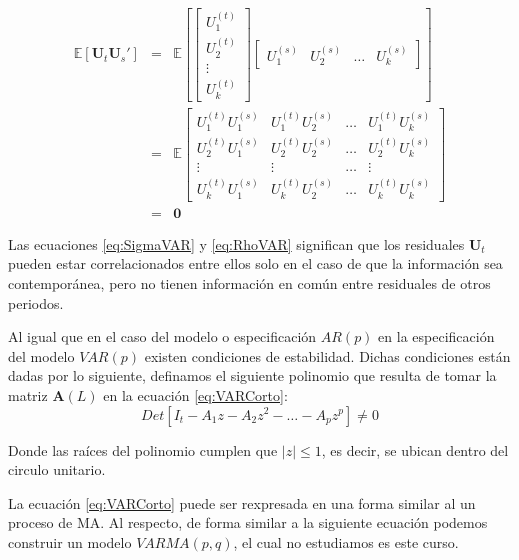 \documentclass[
]{book}
\begin{document}
\begin{enumerate}
\begin{eqnarray}
      \mathbb{E} [\mathbf{U}_t \mathbf{U}_s'] 
      & = &
      \mathbb{E} \left[
      \begin{bmatrix}
      U^{(t)}_{1} \\ U^{(t)}_{2} \\ \vdots \\ U^{(t)}_{k}
      \end{bmatrix}
      \begin{bmatrix}
      U^{(s)}_{1} & U^{(s)}_{2} & \ldots & U^{(s)}_{k}
      \end{bmatrix}
      \right] \nonumber \\
      & =  & \mathbb{E}
      \begin{bmatrix}
      U^{(t)}_{1} U^{(s)}_{1} & U^{(t)}_{1} U^{(s)}_{2} & \ldots & U^{(t)}_{1} U^{(s)}_{k} \\
      U^{(t)}_{2} U^{(s)}_{1} & U^{(t)}_{2} U^{(s)}_{2} & \ldots & U^{(t)}_{2} U^{(s)}_{k} \\
      \vdots & \vdots & \ldots & \vdots \\
      U^{(t)}_{k} U^{(s)}_{1} & U^{(t)}_{k} U^{(s)}_{2} & \ldots & U^{(t)}_{k} U^{(s)}_{k}
      \end{bmatrix} \nonumber \\
      & = & \mathbf{0}
      \label{eq:RhoVAR}
  \end{eqnarray}
\end{enumerate}

Las ecuaciones \eqref{eq:SigmaVAR} y \eqref{eq:RhoVAR} significan que los
residuales \(\mathbf{U}_t\) pueden estar correlacionados entre ellos solo
en el caso de que la información sea contemporánea, pero no tienen
información en común entre residuales de otros periodos.

Al igual que en el caso del modelo o especificación \(AR(p)\) en la
especificación del modelo \(VAR(p)\) existen condiciones de estabilidad.
Dichas condiciones están dadas por lo siguiente, definamos el siguiente
polinomio que resulta de tomar la matriz \(\mathbf{A}(L)\) en la ecuación
\eqref{eq:VARCorto}: \begin{equation}
    Det[I_t - A_1 z - A_2 z^2 - \ldots - A_p z^p] \neq 0
\end{equation}

Donde las raíces del polinomio cumplen que \(|z| \leq 1\), es decir, se
ubican dentro del circulo unitario.

La ecuación \eqref{eq:VARCorto} puede ser rexpresada en una forma similar
al un proceso de MA. Al respecto, de forma similar a la siguiente
ecuación podemos construir un modelo \(VARMA(p,q)\), el cual no estudiamos
es este curso.
\end{document}
